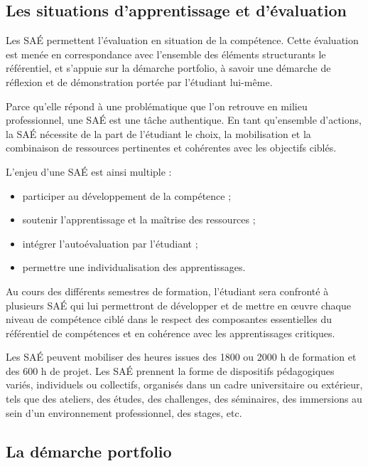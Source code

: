 {
    \setlength{\parindent}{0cm}
    \setlength{\parskip}{1ex}

\subsection*{Les situations d'apprentissage et d'évaluation}
Les SAÉ permettent l'évaluation en situation de la compétence. Cette évaluation est menée en correspondance avec l'ensemble des éléments structurants le référentiel, et s'appuie sur la démarche portfolio, à savoir une démarche de réflexion et de démonstration portée par l'étudiant lui-même.

Parce qu'elle répond à une problématique que l'on retrouve en milieu professionnel, une SAÉ est une tâche authentique. En tant qu'ensemble d'actions, la SAÉ nécessite de la part de l'étudiant le choix, la mobilisation et la combinaison de ressources pertinentes et cohérentes avec les objectifs ciblés.

L'enjeu d'une SAÉ est ainsi multiple :
\begin{itemize}
\item participer au développement de la compétence ;
\item soutenir l'apprentissage et la maîtrise des ressources ;
\item intégrer l'autoévaluation par l'étudiant ;
\item permettre une individualisation des apprentissages.
\end{itemize}

Au cours des différents semestres de formation, l'étudiant sera confronté à plusieurs SAÉ qui lui permettront de développer et de mettre en œuvre chaque niveau de compétence ciblé dans le respect des composantes essentielles du référentiel de compétences et en cohérence avec les apprentissages critiques.

Les SAÉ peuvent mobiliser des heures issues des 1800 ou 2000 h de formation et des 600 h de projet. Les SAÉ prennent la forme de dispositifs pédagogiques variés, individuels ou collectifs, organisés dans un cadre universitaire ou extérieur, tels que des ateliers, des études, des challenges, des séminaires, des immersions au sein d'un environnement professionnel, des stages, etc.

\subsection*{La démarche portfolio}


}
